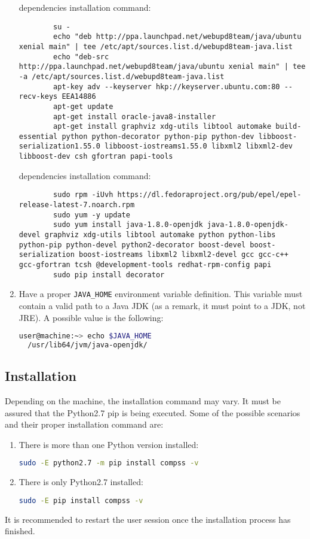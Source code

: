 \begin{enumerate}
    dependencies installation command:
     \begin{lstlisting}
        su -
        echo "deb http://ppa.launchpad.net/webupd8team/java/ubuntu xenial main" | tee /etc/apt/sources.list.d/webupd8team-java.list
        echo "deb-src http://ppa.launchpad.net/webupd8team/java/ubuntu xenial main" | tee -a /etc/apt/sources.list.d/webupd8team-java.list
        apt-key adv --keyserver hkp://keyserver.ubuntu.com:80 --recv-keys EEA14886
        apt-get update
        apt-get install oracle-java8-installer
        apt-get install graphviz xdg-utils libtool automake build-essential python python-decorator python-pip python-dev libboost-serialization1.55.0 libboost-iostreams1.55.0 libxml2 libxml2-dev libboost-dev csh gfortran papi-tools
     \end{lstlisting}
    dependencies installation command:
     \begin{lstlisting}
        sudo rpm -iUvh https://dl.fedoraproject.org/pub/epel/epel-release-latest-7.noarch.rpm
        sudo yum -y update
        sudo yum install java-1.8.0-openjdk java-1.8.0-openjdk-devel graphviz xdg-utils libtool automake python python-libs python-pip python-devel python2-decorator boost-devel boost-serialization boost-iostreams libxml2 libxml2-devel gcc gcc-c++ gcc-gfortran tcsh @development-tools redhat-rpm-config papi
        sudo pip install decorator        
     \end{lstlisting}
 \item Have a proper \verb|JAVA_HOME| environment variable definition. This variable must contain a valid path to a Java JDK (as a remark, it must point to a JDK, not JRE). A possible value is the following:
 \begin{lstlisting}[language=bash]
  user@machine:~> echo $JAVA_HOME
  /usr/lib64/jvm/java-openjdk/\end{lstlisting}
\end{enumerate}


\subsection{Installation}
\label{subsec:pip_installation}
Depending on the machine, the installation command may vary. It must be assured that the Python2.7 pip is being executed. Some of the possible scenarios and their proper installation command are:
\begin{enumerate}
 \item There is more than one Python version installed:
 \begin{lstlisting}[language=bash]
 sudo -E python2.7 -m pip install compss -v\end{lstlisting}
 \item There is only Python2.7 installed:
 \begin{lstlisting}[language=bash]
 sudo -E pip install compss -v \end{lstlisting}
\end{enumerate}
It is recommended to restart the user session once the installation process has finished. 


